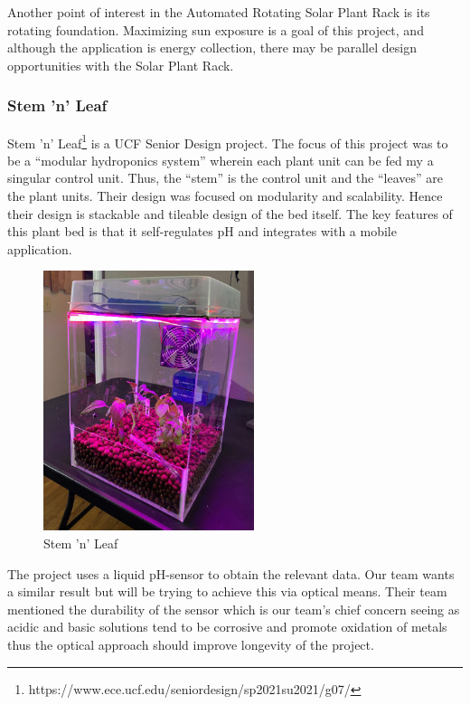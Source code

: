 Another point of interest in the Automated Rotating Solar Plant Rack is its rotating foundation. Maximizing sun exposure is a goal of this project, and although the application is energy collection, there may be parallel design opportunities with the Solar Plant Rack.


\subsubsection{Stem 'n' Leaf}
Stem 'n' Leaf\footnote{https://www.ece.ucf.edu/seniordesign/sp2021su2021/g07/} is a UCF Senior Design project. The focus of this project was to be a ``modular hydroponics system'' wherein each plant unit can be fed my a singular control unit. Thus, the ``stem'' is the control unit and the ``leaves'' are the plant units. Their design was focused on modularity and scalability. Hence their design is stackable and tileable design of the bed itself. The key features of this plant bed is that it self-regulates pH and integrates with a mobile application.
\begin{figure}[H]
    \caption{Stem 'n' Leaf}
    \centering
    \includegraphics[width=.6\textwidth]{images/3-1-5Pic.png}
\end{figure}

The project uses a liquid pH-sensor to obtain the relevant data. Our team wants a similar result but will be trying to achieve this via optical means. Their team mentioned the durability of the sensor which is our team's chief concern seeing as acidic and basic solutions tend to be corrosive and promote oxidation of metals thus the optical approach should improve longevity of the project. 

